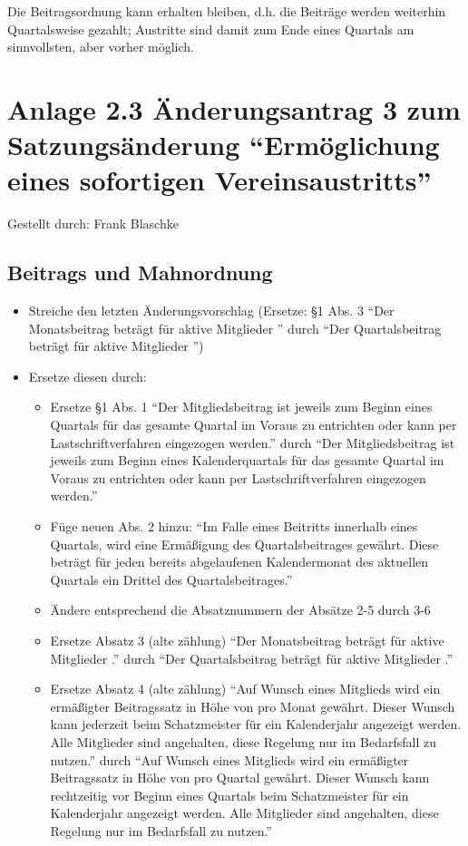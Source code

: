\documentclass[a4paper,12pt,titlepage]{scrartcl}
\begin{document}
Die Beitragsordnung kann erhalten bleiben, d.h. die Beiträge werden weiterhin Quartalsweise gezahlt; Austritte
sind damit zum Ende eines Quartals am sinnvollsten, aber vorher möglich.

\newpage

\section*{Anlage 2.3 Änderungsantrag 3 zum Satzungsänderung “Ermöglichung eines sofortigen Vereinsaustritts”}

Gestellt durch: Frank Blaschke

\subsection*{Beitrags und Mahnordnung}
\begin{itemize}
	\item Streiche den letzten Änderungsvorschlag (Ersetze: §1 Abs. 3 “Der Monatsbeitrag beträgt für aktive Mitglieder ” durch “Der Quartalsbeitrag beträgt für aktive Mitglieder ”)
	\item Ersetze diesen durch:
	\begin{itemize}
  		\item Ersetze §1 Abs. 1 “Der Mitgliedsbeitrag ist jeweils zum Beginn eines Quartals für das gesamte Quartal im Voraus zu entrichten oder kann per Lastschriftverfahren eingezogen werden.” durch “Der Mitgliedsbeitrag ist jeweils zum Beginn eines Kalenderquartals für das gesamte Quartal im Voraus zu entrichten oder kann per Lastschriftverfahren eingezogen werden.”
  		\item Füge neuen Abs. 2 hinzu: “Im Falle eines Beitritts innerhalb eines Quartals, wird eine Ermäßigung des Quartalsbeitrages gewährt. Diese beträgt für jeden bereits abgelaufenen Kalendermonat des aktuellen Quartals ein Drittel des Quartalsbeitrages.”
  		\item Ändere entsprechend die Absatznummern der Absätze 2-5 durch 3-6
  		\item Ersetze Absatz 3 (alte zählung) “Der Monatsbeitrag beträgt für aktive Mitglieder .” durch “Der Quartalsbeitrag beträgt für aktive Mitglieder .”
  		\item Ersetze Absatz 4 (alte zählung) “Auf Wunsch eines Mitglieds wird ein ermäßigter Beitragssatz in Höhe von  pro Monat gewährt. Dieser Wunsch kann jederzeit beim Schatzmeister für ein Kalenderjahr angezeigt werden. Alle Mitglieder sind angehalten, diese Regelung nur im Bedarfsfall zu nutzen.” durch “Auf Wunsch eines Mitglieds wird ein ermäßigter Beitragssatz in Höhe von  pro Quartal gewährt. Dieser Wunsch kann rechtzeitig vor Beginn eines Quartals beim Schatzmeister für ein Kalenderjahr angezeigt werden. Alle Mitglieder sind angehalten, diese Regelung nur im Bedarfsfall zu nutzen.”
  	\end{itemize}	
\end{itemize}  		
\end{document}
